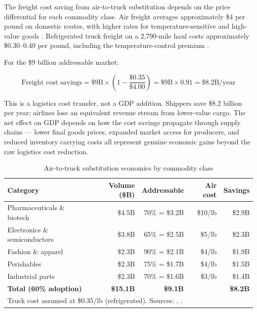 The freight cost saving from air-to-truck substitution depends on the price differential
for each commodity class. Air freight averages approximately \$4 per pound on domestic
routes, with higher rates for temperature-sensitive and high-value goods
\citep{BTS_airfreight2023}. Refrigerated truck freight on a 2,790-mile haul costs
approximately \$0.30--0.40 per pound, including the temperature-control premium
\citep{FHWA_freight2023}.

For the \$9 billion addressable market:

\begin{equation}
\text{Freight cost savings} = \$9\text{B} \times \left(1 - \frac{\$0.35}{\$4.00}\right) = \$9\text{B} \times 0.91 = \$8.2\text{B/year}
\end{equation}

\noindent
This is a logistics cost transfer, not a GDP addition. Shippers save \$8.2 billion per year;
airlines lose an equivalent revenue stream from lower-value cargo. The net effect on
GDP depends on how the cost savings propagate through supply chains --- lower final goods
prices, expanded market access for producers, and reduced inventory carrying costs all
represent genuine economic gains beyond the raw logistics cost reduction.

\begin{table}[h]
\centering
\caption{Air-to-truck substitution economics by commodity class}
\label{tab:substitution}
\begin{tabular}{lrrrr}
\toprule
Category & Volume (\$B) & Addressable & Air cost & Savings \\
\midrule
Pharmaceuticals \& biotech     & \$4.5B & 70\% = \$3.2B & \$10/lb  & \$2.9B \\
Electronics \& semiconductors  & \$3.8B & 65\% = \$2.5B & \$5/lb   & \$2.3B \\
Fashion \& apparel             & \$2.3B & 90\% = \$2.1B & \$4/lb   & \$1.9B \\
Perishables                    & \$2.3B & 75\% = \$1.7B & \$4/lb   & \$1.5B \\
Industrial parts               & \$2.3B & 70\% = \$1.6B & \$3/lb   & \$1.4B \\
\midrule
\textbf{Total (60\% adoption)} & \textbf{\$15.1B} & \textbf{\$9.1B} & & \textbf{\$8.2B} \\
\bottomrule
\multicolumn{5}{l}{\footnotesize Truck cost assumed at \$0.35/lb (refrigerated). Sources: \citet{BTS_airfreight2023}, \citet{FHWA_freight2023}.} \\
\end{tabular}
\end{table}

